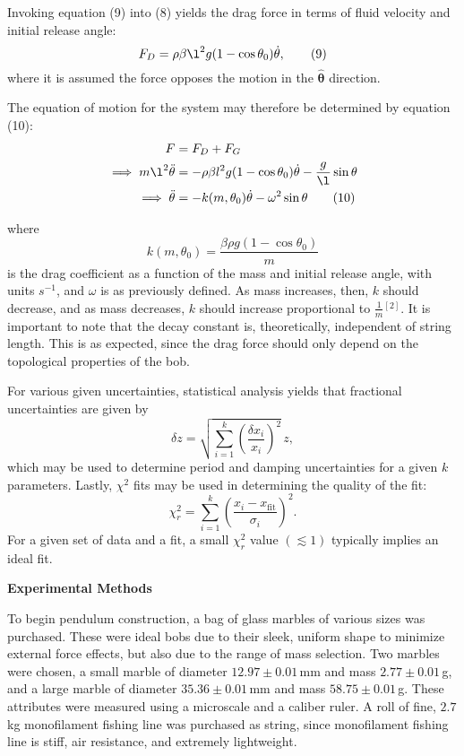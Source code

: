 \documentclass[11pt]{article}
\begin{document}
\begin{multicols}{2}
    Invoking equation (9) into (8) yields the drag force in terms of fluid velocity and initial release angle:
    \[
        F_D = \rho \beta \l^2 g (1-\cos\theta_0) \dot\theta, \tag{9}
    \] 
    \nd where it is assumed the force opposes the motion in the $\boldsymbol{\hat \theta}$ direction. 

    The equation of motion for the system may therefore be determined by equation (10): 
    \begin{align*}
        F &= F_D + F_G\\
        \implies m\l^2 \ddot\theta &= -\rho \beta l^2g(1-\cos\theta_0)\dot\theta - \frac{g}{\l}\sin\theta \\
        \implies \ddot\theta &= -k(m, \theta_0)\dot\theta - \omega^2\sin\theta \tag{10}
    \end{align*}
    
    \nd where \[k(m, \theta_0)=\frac{\beta \rho g (1-\cos\theta_0)}{m} \tag{11}\] is the drag coefficient as a function of the mass and initial release angle, with units $s^{-1}$, and $\omega$ is as previously defined. As mass increases, then, $k$ should decrease, and as mass decreases, $k$ should increase proportional to $\frac{1}{m}$$^{[2]}$. It is important to note that the decay constant is, theoretically, independent of string length. This is as expected, since the drag force should only depend on the topological properties of the bob. 
    
    For various given uncertainties, statistical analysis yields that fractional uncertainties are given by 
    \[
        \delta z = \sqrt{\sum_{i=1}^{k} \left(\frac{\delta x_i}{x_i}\right)^2}\, z, \tag{12}  
    \]
    \nd which may be used to determine period and damping uncertainties for a given $k$ parameters. Lastly, $\chi^2$ fits may be used in determining the quality of the fit:
    \[
        \chi^2_r = \sum_{i=1}^{k}\left(\frac{x_i - x_{\text{fit}}}{\sigma_i}  \right)^2. \tag{13}
    \]
    \nd For a given set of data and a fit, a small $\chi^2_r$ value $\left(\lesssim 1\right)$ typically implies an ideal fit.



    

    \vspace{20pt}

     \selectfont \textbf{Experimental Methods}
    
     \selectfont To begin pendulum construction, a bag of glass marbles of various sizes was purchased. These were ideal bobs due to their sleek, uniform shape to minimize external force effects, but also due to the range of mass selection. Two marbles were chosen, a small marble of diameter $12.97\pm 0.01\,$mm and mass $2.77\pm 0.01\,$g, and a large marble of diameter $35.36\pm0.01\,$mm and mass $58.75\pm 0.01\,$g. These attributes were measured using a microscale and a caliber ruler. A roll of fine, $2.7\, $kg monofilament fishing line was purchased as string, since monofilament fishing line is stiff, air resistance, and extremely lightweight. 
    

\end{multicols}
\end{document}
